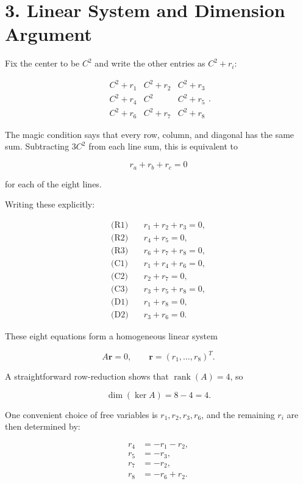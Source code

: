 \documentclass[12pt]{article}
\begin{document}
\section*{3. Linear System and Dimension Argument}

Fix the center to be $C^2$ and write the other entries as $C^2 + r_i$:


\[
\begin{matrix}
C^2+r_1 & C^2+r_2 & C^2+r_3 \\
C^2+r_4 & C^2     & C^2+r_5 \\
C^2+r_6 & C^2+r_7 & C^2+r_8
\end{matrix}.
\]


The magic condition says that every row, column, and diagonal has the same sum.
Subtracting $3C^2$ from each line sum, this is equivalent to


\[
r_a + r_b + r_c = 0
\]


for each of the eight lines.

Writing these explicitly:


\[
\begin{aligned}
\text{(R1)}\quad & r_1 + r_2 + r_3 = 0,\\
\text{(R2)}\quad & r_4 + r_5 = 0,\\
\text{(R3)}\quad & r_6 + r_7 + r_8 = 0,\\
\text{(C1)}\quad & r_1 + r_4 + r_6 = 0,\\
\text{(C2)}\quad & r_2 + r_7 = 0,\\
\text{(C3)}\quad & r_3 + r_5 + r_8 = 0,\\
\text{(D1)}\quad & r_1 + r_8 = 0,\\
\text{(D2)}\quad & r_3 + r_6 = 0.
\end{aligned}
\]



These eight equations form a homogeneous linear system


\[
A\mathbf{r} = 0,\qquad \mathbf{r} = (r_1,\dots,r_8)^T.
\]


A straightforward row-reduction shows that $\operatorname{rank}(A) = 4$, so


\[
\dim(\ker A) = 8 - 4 = 4.
\]


One convenient choice of free variables is $r_1,r_2,r_3,r_6$, and the remaining
$r_i$ are then determined by:


\[
\begin{aligned}
r_4 &= -r_1 - r_2,\\
r_5 &= -r_3,\\
r_7 &= -r_2,\\
r_8 &= -r_6 + r_2.
\end{aligned}
\]
\end{document}

